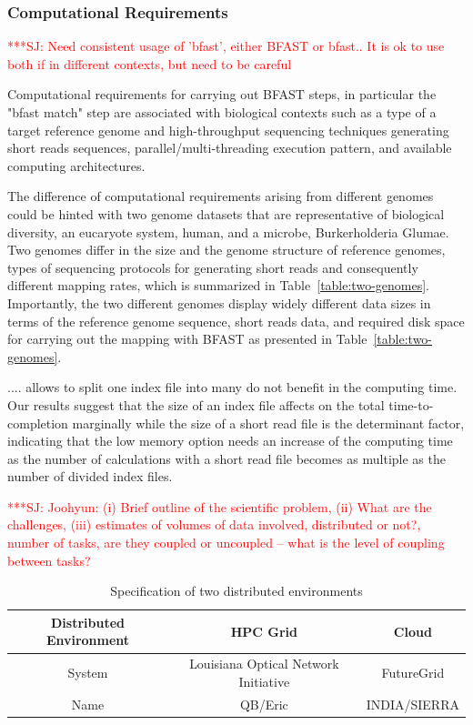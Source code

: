 \documentclass[12pt]{article}
\newcommand{\jhanote}[1]{ {\textcolor{red}     {***SJ: #1}}}
\newcommand{\jhanote}[1]{}
\begin{document}
\subsubsection{Computational Requirements}

\jhanote{Need consistent usage of 'bfast', either BFAST or bfast.. It is ok
to use both if in different contexts, but need to be careful}

Computational requirements for carrying out BFAST steps, in particular the "bfast match" step are associated with biological contexts such as a type of a target reference genome and high-throughput sequencing techniques generating short reads sequences, parallel/multi-threading execution pattern, and available computing architectures.  

The difference of computational requirements arising from different genomes could be hinted with two genome datasets that are representative of biological diversity, an eucaryote system, human, and a microbe, Burkerholderia Glumae\cite{kim2011}.  Two genomes differ in the size and the genome structure of reference genomes, types of sequencing protocols for generating short reads and consequently different mapping rates, which is summarized in Table~\ref{table:two-genomes}.  Importantly, the two different genomes display widely different data sizes in terms of the reference genome sequence, short reads data, and required disk space for carrying out the mapping with BFAST as presented in Table~\ref{table:two-genomes}. 

.... allows to split one index file into many do not benefit in the computing time. Our results suggest that the size of an index file affects on the total time-to-completion marginally while the size of a short read file is the determinant factor, indicating that the low memory option needs an increase of the computing time as the number of calculations with a short read file becomes as multiple as the number of divided index files.   

\jhanote{Joohyun: (i) Brief outline of the scientific problem,
  (ii) What are the challenges, (iii) estimates of volumes of data
  involved, distributed or not?, number of tasks, are they coupled or
  uncoupled -- what is the level of coupling between tasks?}

 \begin{table}
 \begin{tabular}{|c|cc|} 
 \hline 
Distributed Environment &  HPC Grid &  Cloud \\ \hline
System  &  Louisiana Optical Network Initiative & FutureGrid \\
Name &  QB/Eric   &  INDIA/SIERRA \\
 \hline
 \end{tabular}
\caption{Specification of two distributed environments}
\label{table:two-systems} 
\end{table}
 
\end{document}
